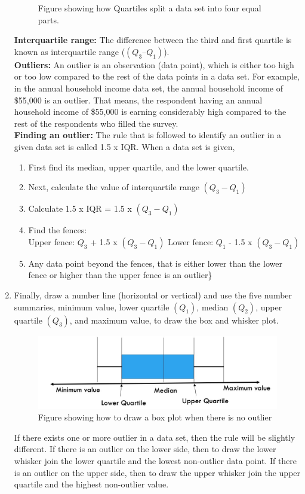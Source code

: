 \documentclass[a4paper, 11pt]{article}
\begin{document}
\begin{enumerate}[label=(\alph*), noitemsep]
\begin{figure}[h!]
		\caption{Figure showing how Quartiles split a data set into four equal parts.} 
	\end{figure}
			\textbf{Interquartile range:} The difference between the third and first quartile is known as interquartile range ($(Q_3 – Q_1)$).\\[1ex]
			\textbf{Outliers:} An outlier is an observation (data point), which is either too high or too low compared to the rest of the data points in a data set. For example, in the annual household income data set, the annual household income of \$55,000 is an outlier. That means, the respondent having an annual household income of \$55,000 is earning considerably high compared to the rest of the respondents who filled the survey.\\[1ex]
			\textbf{Finding an outlier:} The rule that is followed to identify an outlier in a given data set is called 1.5 x IQR. When a data set is given, 
			\begin{enumerate}[label=(\alph*), noitemsep]
			\item
			First find its median, upper quartile, and the lower quartile. 
			\item
			Next, calculate the value of interquartile range $(Q_3-Q_1)$
			\item
			Calculate 1.5 x IQR = 1.5 x $(Q_3-Q_1)$
			\item
		    Find the fences:\\[1ex]
		    Upper fence: $Q_3$ + 1.5 x $(Q_3-Q_1)$
		    Lower fence: $Q_1$ - 1.5 x $(Q_3-Q_1)$
		    \item
		    Any data point beyond the fences, that is either lower than the lower fence or higher than the upper fence is an outlier\}
				\end{enumerate}
			\item
			Finally, draw a number line (horizontal or vertical) and use the five number summaries, minimum value, lower quartile $ (Q_1)$, median $(Q_2)$, upper quartile $(Q_3)$, and maximum value, to draw the box and whisker plot.
			\begin{figure}[h!]
		\includegraphics[width=\linewidth]{draw_box.jpg}
		\caption{Figure showing how to draw a box plot when there is no outlier} 
	\end{figure}
			If there exists one or more outlier in a data set, then the rule will be slightly different. If there is an outlier on the lower side, then to draw the lower whisker join the lower quartile and the lowest non-outlier data point. If there is an outlier on the upper side, then to draw the upper whisker join the upper quartile and the highest non-outlier value. 
			\end{enumerate}
%
\end{document}
